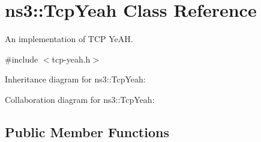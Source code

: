 \hypertarget{classns3_1_1TcpYeah}{}\section{ns3\+:\+:Tcp\+Yeah Class Reference}
\label{classns3_1_1TcpYeah}


An implementation of T\+CP Ye\+AH.  




{\ttfamily \#include $<$tcp-\/yeah.\+h$>$}



Inheritance diagram for ns3\+:\+:Tcp\+Yeah\+:


Collaboration diagram for ns3\+:\+:Tcp\+Yeah\+:
\subsection*{Public Member Functions}
